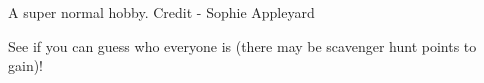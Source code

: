A super normal hobby. Credit - Sophie Appleyard

See if you can guess who everyone is (there may be scavenger hunt points to gain)!